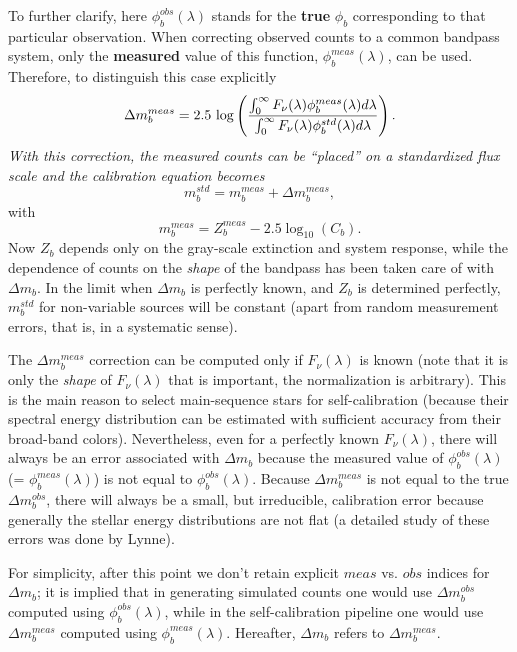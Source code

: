 \documentclass[12pt,preprint]{aastex}
\begin{document}
To further clarify, here $\phi_b^{obs}(\lambda)$ stands for the {\bf true} 
$\phi_b$ corresponding to that particular observation. When correcting
observed counts to a common bandpass system, only the {\bf measured} 
value of this function, $\phi_b^{meas}(\lambda)$, can be used. Therefore,
to distinguish this case explicitly 
\begin{equation}
\label{Eq:dmCorrMeas}
  \Delta m_b^{meas} = 
 2.5\,\log\left({\int_0^\infty F_\nu(\lambda) \phi_b^{meas}(\lambda)
 d\lambda \over \int_0^\infty F_\nu(\lambda) 
\phi_b^{std}(\lambda) d\lambda} \right). 
\end{equation}
{\it With this correction, the measured counts can be ``placed'' on a standardized flux 
scale and the calibration equation becomes} 
\begin{equation}
\label{eqn:mmstd}
                     m_b^{std} = m_b^{meas} + \Delta m_b^{meas}, 
\end{equation}
with
\begin{equation}
\label{eqn:mmeas}
                       m_b^{meas} = Z^{meas}_b  -2.5\log_{10}(C_b). 
\end{equation}
Now $Z_b$ depends only on the gray-scale extinction and system response, while the dependence 
of  counts on the {\it shape} of the bandpass has been taken care of with $\Delta m_b$.
In the limit when $\Delta m_b$ is perfectly known, and $Z_b$ is determined perfectly, 
$m_b^{std}$ for non-variable sources will be constant (apart from random measurement
errors, that is, in a systematic sense). 

The $\Delta m_b^{meas}$ correction can be computed only if $F_\nu(\lambda)$ is
known (note that it is only the {\it shape} of $F_\nu(\lambda)$ that 
is important, the normalization is arbitrary). This is the main
reason to select main-sequence stars for self-calibration (because
their spectral energy distribution can be estimated with sufficient
accuracy from their broad-band colors). Nevertheless, even for a
perfectly known $F_\nu(\lambda)$, there will always be an 
error associated with $\Delta m_b$ because the measured value
of $\phi_b^{obs}(\lambda)$ (= $\phi_b^{meas}(\lambda)$) is not 
equal to $\phi_b^{obs}(\lambda)$.  Because $\Delta m_b^{meas}$
is not equal to the true $\Delta m_b^{obs}$, there will always be
a small, but irreducible, calibration error because generally the stellar
energy distributions are not flat (a detailed study of these errors was 
done by Lynne). 

For simplicity, after this point we don't retain explicit $meas$ vs. $obs$ indices for 
$\Delta m_b$; it is implied that in generating simulated counts one 
would use $\Delta m_b^{obs}$ computed using $\phi_b^{obs}(\lambda)$, 
while in the self-calibration pipeline one would use $\Delta m_b^{meas}$ 
computed using  $\phi_b^{meas}(\lambda)$. Hereafter, $\Delta m_b$ refers 
to $\Delta m_b^{meas}$. 
\end{document}

